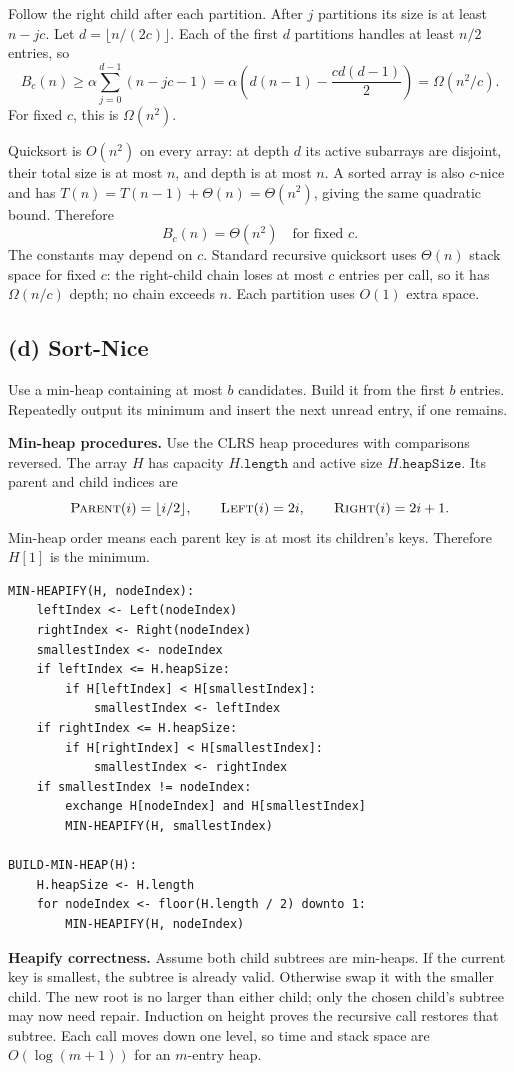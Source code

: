 \documentclass[11pt,a4paper]{article}
\newcommand{\parttitle}[1]{\Needspace{10\baselineskip}\subsection*{#1}}
\newcommand{\proc}[1]{\textsc{#1}}
\begin{document}
Follow the right child after each partition. After $j$ partitions its size is at least $n-jc$. Let $d=\lfloor n/(2c)\rfloor$. Each of the first $d$ partitions handles at least $n/2$ entries, so
\[
B_c(n)\ge\alpha\sum_{j=0}^{d-1}(n-jc-1)
=\alpha\left(d(n-1)-\frac{cd(d-1)}2\right)
=\Omega(n^2/c).
\]
For fixed $c$, this is $\Omega(n^2)$.

Quicksort is $O(n^2)$ on every array: at depth $d$ its active subarrays are disjoint, their total size is at most $n$, and depth is at most $n$. A sorted array is also $c$-nice and has $T(n)=T(n-1)+\Theta(n)=\Theta(n^2)$, giving the same quadratic bound. Therefore
\[
\boxed{B_c(n)=\Theta(n^2)\quad\text{for fixed }c.}
\]
The constants may depend on $c$. Standard recursive quicksort uses $\Theta(n)$ stack space for fixed $c$: the right-child chain loses at most $c$ entries per call, so it has $\Omega(n/c)$ depth; no chain exceeds $n$. Each partition uses $O(1)$ extra space. 

\parttitle{(d) Sort-Nice}
Use a min-heap containing at most $b$ candidates. Build it from the first $b$ entries. Repeatedly output its minimum and insert the next unread entry, if one remains.

\textbf{Min-heap procedures.} Use the CLRS heap procedures with comparisons reversed. The array $H$ has capacity $H.\mathtt{length}$ and active size $H.\mathtt{heapSize}$. Its parent and child indices are
\[
\proc{Parent}(i)=\lfloor i/2\rfloor,\qquad
\proc{Left}(i)=2i,\qquad \proc{Right}(i)=2i+1.
\]
Min-heap order means each parent key is at most its children's keys. Therefore $H[1]$ is the minimum.

\begin{lstlisting}
MIN-HEAPIFY(H, nodeIndex):
    leftIndex <- Left(nodeIndex)
    rightIndex <- Right(nodeIndex)
    smallestIndex <- nodeIndex
    if leftIndex <= H.heapSize:
        if H[leftIndex] < H[smallestIndex]:
            smallestIndex <- leftIndex
    if rightIndex <= H.heapSize:
        if H[rightIndex] < H[smallestIndex]:
            smallestIndex <- rightIndex
    if smallestIndex != nodeIndex:
        exchange H[nodeIndex] and H[smallestIndex]
        MIN-HEAPIFY(H, smallestIndex)

BUILD-MIN-HEAP(H):
    H.heapSize <- H.length
    for nodeIndex <- floor(H.length / 2) downto 1:
        MIN-HEAPIFY(H, nodeIndex)
\end{lstlisting}
\textbf{Heapify correctness.} Assume both child subtrees are min-heaps. If the current key is smallest, the subtree is already valid. Otherwise swap it with the smaller child. The new root is no larger than either child; only the chosen child's subtree may now need repair. Induction on height proves the recursive call restores that subtree. Each call moves down one level, so time and stack space are $O(\log(m+1))$ for an $m$-entry heap.
\end{document}
